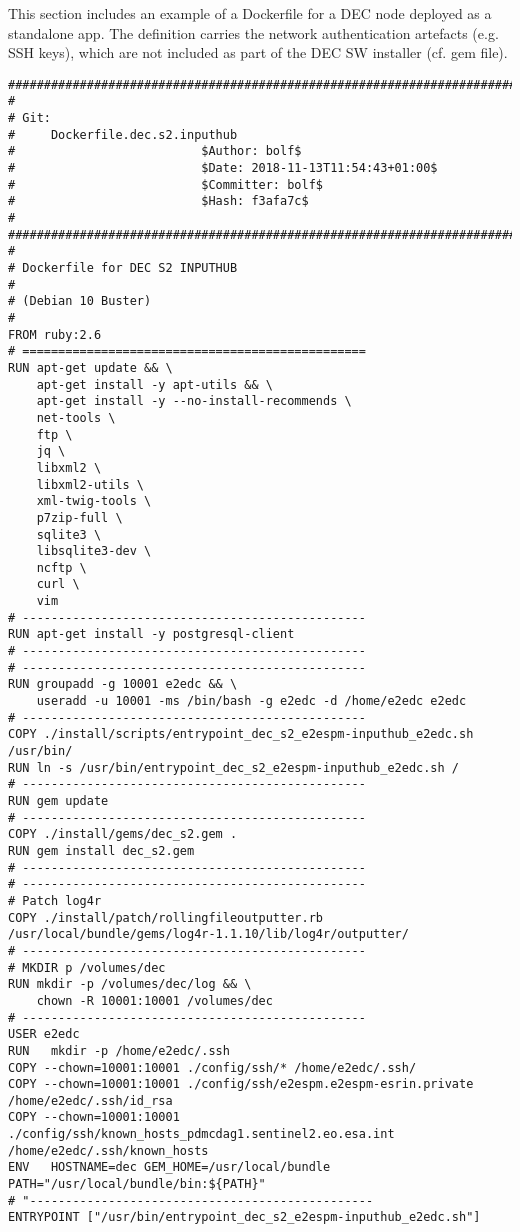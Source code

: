 \documentclass[dec_sum_main.tex]{subfiles}
\begin{document}
 
\par
\noindent
This section includes an example of a Dockerfile for a DEC node deployed as a standalone app. The definition carries the network authentication artefacts (e.g. SSH keys), which are not included as part of the DEC SW installer (cf. gem file).\newline

\begin{Verbatim}[tabsize=4]
#########################################################################
#
# Git:
#     Dockerfile.dec.s2.inputhub  
#                          $Author: bolf$
#                          $Date: 2018-11-13T11:54:43+01:00$ 
#                          $Committer: bolf$
#                          $Hash: f3afa7c$
#
#########################################################################
#
# Dockerfile for DEC S2 INPUTHUB
# 
# (Debian 10 Buster)
#
FROM ruby:2.6
# ================================================
RUN apt-get update && \
    apt-get install -y apt-utils && \
    apt-get install -y --no-install-recommends \
    net-tools \
    ftp \
    jq \
    libxml2 \
    libxml2-utils \
    xml-twig-tools \
    p7zip-full \
    sqlite3 \
    libsqlite3-dev \
    ncftp \
    curl \
    vim
# ------------------------------------------------
RUN apt-get install -y postgresql-client
# ------------------------------------------------
# ------------------------------------------------
RUN groupadd -g 10001 e2edc && \
    useradd -u 10001 -ms /bin/bash -g e2edc -d /home/e2edc e2edc
# ------------------------------------------------
COPY ./install/scripts/entrypoint_dec_s2_e2espm-inputhub_e2edc.sh /usr/bin/
RUN ln -s /usr/bin/entrypoint_dec_s2_e2espm-inputhub_e2edc.sh /    
# ------------------------------------------------
RUN gem update
# ------------------------------------------------
COPY ./install/gems/dec_s2.gem .
RUN gem install dec_s2.gem
# ------------------------------------------------
# ------------------------------------------------
# Patch log4r
COPY ./install/patch/rollingfileoutputter.rb /usr/local/bundle/gems/log4r-1.1.10/lib/log4r/outputter/
# ------------------------------------------------
# MKDIR p /volumes/dec
RUN mkdir -p /volumes/dec/log && \
    chown -R 10001:10001 /volumes/dec
# ------------------------------------------------
USER e2edc
RUN   mkdir -p /home/e2edc/.ssh
COPY --chown=10001:10001 ./config/ssh/* /home/e2edc/.ssh/
COPY --chown=10001:10001 ./config/ssh/e2espm.e2espm-esrin.private /home/e2edc/.ssh/id_rsa
COPY --chown=10001:10001 ./config/ssh/known_hosts_pdmcdag1.sentinel2.eo.esa.int /home/e2edc/.ssh/known_hosts
ENV   HOSTNAME=dec GEM_HOME=/usr/local/bundle PATH="/usr/local/bundle/bin:${PATH}"
# "------------------------------------------------
ENTRYPOINT ["/usr/bin/entrypoint_dec_s2_e2espm-inputhub_e2edc.sh"]
\end{Verbatim}
\end{document}
